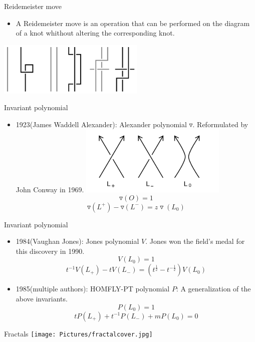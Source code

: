 \documentclass[]{beamer}
\begin{document}
\begin{frame}{Reidemeister move}
\begin{itemize}
    \item A Reidemeister move is an operation that can be performed on the diagram
of a knot whithout altering the corresponding knot.
\end{itemize}
\centering
\includegraphics[width=7cm]{Pictures/r.png}
\end{frame}

\begin{frame}{Invariant polynomial}
    \begin{itemize}
        \item 1923(James Waddell Alexander): Alexander polynomial $\triangledown$. Reformulated by John Conway in 1969.
\centering
\includegraphics[width =7cm]{Pictures/L.png}
        $$\triangledown(O) = 1$$
        $$\triangledown(L^+) - \triangledown(L^-) = z\triangledown(L_0)$$
    \end{itemize}
\end{frame}

\begin{frame}{Invariant polynomial}
\begin{itemize}
    \item 1984(Vaughan Jones): Jones polynomial $V$. Jones won the field's medal for this discovery in 1990.
    $$V(L_0) = 1$$
    $$t^{-1}V(L_+) - tV(L_-) = (t^{\frac{1}{2}} - t^{-\frac{1}{2}})V(L_0)$$
    \item 1985(multiple authors): HOMFLY-PT polynomial $P$: A generalization of the above invariants.
    $$P(L_0) = 1$$
    $$tP(L_+) + t^{-1}P(L_-) + mP(L_0) = 0$$
\end{itemize}
\end{frame}


\begin{frame}{Fractals}
\centering
\texttt{[image: Pictures/fractalcover.jpg]}
\end{frame}
\end{document}
